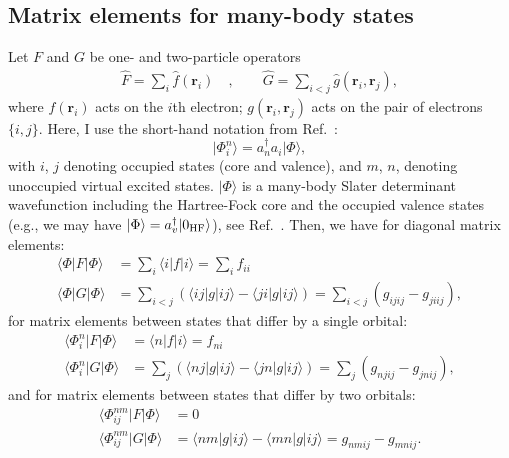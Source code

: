 \documentclass[10pt,twocolumn,a4paper]{article}%
\newcommand{\bra}[1]{\ensuremath{\langle #1|}}	%
\newcommand{\ket}[1]{\ensuremath{|#1\rangle}}	%
\renewcommand{\v}[1]{\ensuremath{\boldsymbol{#1}}}		%
\begin{document}
\subsection{Matrix elements for many-body states}


Let $F$ and $G$ be one- and two-particle operators
\begin{align}
\hat F = \sum_i \hat f(\v{r}_i) \quad,\qquad
\hat G = \sum_{i<j} \hat g(\v{r}_i,\v{r}_j),
\end{align}
where $f(\v{r}_i)$ acts on the $i$th electron; $g(\v{r}_i,\v{r}_j)$ acts on the pair of electrons $\{i,j\}$.
Here, I use the short-hand notation from Ref.~\cite{Lindgren1986}:
\[
\ket{\Phi_i^n} = a_n^\dag a_i \ket{\Phi},
\]
with $i$, $j$ denoting occupied states (core and valence), and $m$, $n$, denoting unoccupied virtual excited states.
$\ket{\Phi}$ is a many-body Slater determinant wavefunction including the Hartree-Fock core and the occupied valence states (e.g., we may have $\ket{\Phi} = a_v^\dag\ket{0_{\rm HF}}$), see Ref.~\cite{Lindgren1986}.
Then, we have for diagonal matrix elements:
\begin{equation}\begin{split}
\bra{\Phi}F\ket{\Phi} &= \sum_i \bra{i}f\ket{i}  = \sum_i f_{ii}\\
\bra{\Phi}G\ket{\Phi} &= \sum_{i<j} \left( \bra{ij}g\ket{ij} - \bra{ji}g\ket{ij} \right) = \sum_{i<j} (g_{ijij}-g_{jiij}),
\end{split}\end{equation}
for matrix elements between states that differ by a single orbital:
\begin{equation}\begin{split}
\bra{\Phi^n_i}F\ket{\Phi} &=  \bra{n}f\ket{i}  = f_{ni}\\
\bra{\Phi^n_i}G\ket{\Phi} &= \sum_{j} \left( \bra{nj}g\ket{ij} - \bra{jn}g\ket{ij} \right)  = \sum_{j} (g_{njij}-g_{jnij}) ,
\end{split}\end{equation}
and for matrix elements between states that differ by two orbitals:
\begin{equation}\begin{split}\label{eq:G-twobody}
\bra{\Phi^{nm}_{ij}}F\ket{\Phi} &=  0 \\
\bra{\Phi^{nm}_{ij}}G\ket{\Phi} &= \bra{nm}g\ket{ij} - \bra{mn}g\ket{ij} = g_{nmij}-g_{mnij}.
\end{split}\end{equation}
\end{document}
